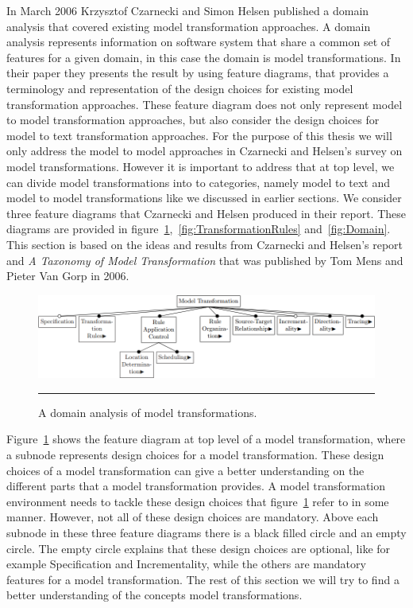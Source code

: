 In March 2006 Krzysztof Czarnecki and Simon Helsen published a domain analysis
that covered existing model transformation approaches\cite{Czarnecki2006}. A
domain analysis represents information on software system that share a common set of
features for a given domain\cite{FODA,Prieto-Diaz1990}, in this case the domain
is model transformations. In their paper they presents the result by using feature
diagrams, that provides a terminology and representation of the design choices
for existing model transformation approaches. These feature diagram does not
only represent model to model transformation approaches, but also consider the
design choices for model to text transformation approaches. For the purpose of
this thesis we will only address the model to model approaches in Czarnecki and
Helsen's survey on model transformations. However it is important to address
that at top level, we can divide model transformations into to categories,
namely model to text and model to model transformations like we discussed in
earlier sections. We consider three feature diagrams that Czarnecki and
Helsen produced in their report\cite{Czarnecki2006}. These diagrams are provided in
figure~\ref{fig:Model_Transformation_Survey},~\ref{fig:TransformationRules}
and~\ref{fig:Domain}. This section is based on the ideas and results from
Czarnecki and Helsen's report and \textit{A Taxonomy of Model
Transformation}\cite{Mens2006} that was published by Tom Mens and Pieter Van
Gorp in 2006.

\begin{figure}[H]
  \centering
    \includegraphics[scale=0.65]{./Figures/Model_Transformation_Survey_1.png}
    \rule{35em}{0.5pt}
  \caption[Domain Analysis of Model Transformations]
  				{A domain analysis of model transformations\cite{Czarnecki2006}.}
  \label{fig:Model_Transformation_Survey}
\end{figure}

Figure~\ref{fig:Model_Transformation_Survey} shows the feature diagram at top
level of a model transformation, where a subnode represents design choices for
a model transformation. These design choices of a model transformation can give
a better understanding on the different parts that a model transformation
provides. A model transformation environment needs to tackle these design
choices that figure~\ref{fig:Model_Transformation_Survey} refer to in
some manner. However, not all of these design choices are mandatory. 
Above each subnode in these three feature diagrams there is a black filled
circle and an empty circle. The empty circle explains that these design choices
are optional, like for example Specification and Incrementality, while the
others are mandatory features for a model transformation. The rest of this
section we will try to find a better understanding of the concepts model
transformations. 

